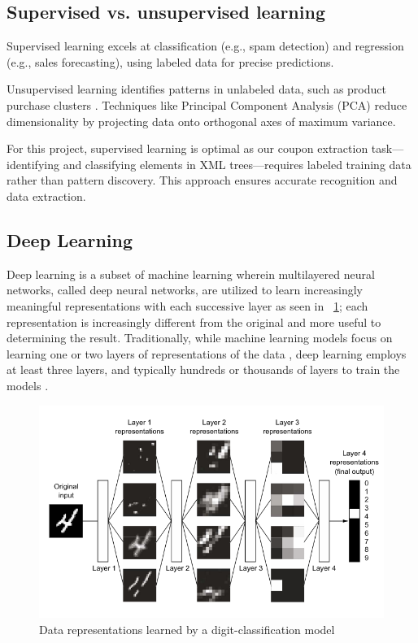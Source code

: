 \documentclass[licencjacka,en]{pracamgr}
\begin{document}
\subsection{Supervised vs. unsupervised learning}
Supervised learning excels at classification (e.g., spam detection) and regression (e.g., sales forecasting), using labeled data for precise predictions.

Unsupervised learning identifies patterns in unlabeled data, such as product purchase clusters \cite{supervised_ibm}. Techniques like Principal Component Analysis (PCA) \cite{PCA} reduce dimensionality by projecting data onto orthogonal axes of maximum variance.

For this project, supervised learning is optimal as our coupon extraction task—identifying and classifying elements in XML trees—requires labeled training data rather than pattern discovery. This approach ensures accurate recognition and data extraction.

\subsection{Deep Learning}
Deep learning is a subset of machine learning wherein multilayered neural networks, called deep neural networks, are utilized to learn increasingly meaningful representations with each successive layer as seen in ~\ref{fig:nn_simple}; each representation is increasingly different from the original and more useful to determining the result. Traditionally, while machine learning models focus on learning one or two layers of representations of the data \cite{francuz}, deep learning employs at least three layers, and typically hundreds or thousands of layers to train the models \cite{ibm_dl}.

\begin{figure}
    \centering
    \includegraphics[width=0.5\linewidth]{bachelor_images/nn_simple.png}
    \caption{Data representations learned by a digit-classification model \cite{francuz}}
    \label{fig:nn_simple}
\end{figure}
\end{document}
